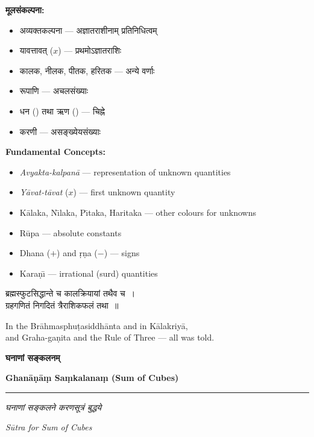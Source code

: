 \documentclass[11pt,a4paper]{article}
\newcommand{\dev}[1]{{\devanagarifont #1}}
\newcommand{\bicol}[2]{%
\noindent%
\begin{minipage}[t]{0.48\textwidth}
\begin{flushleft}
\small
#1
\end{flushleft}
\end{minipage}%
\hfill%
\begin{minipage}[t]{0.48\textwidth}
\begin{flushleft}
\small
#2
\end{flushleft}
\end{minipage}%
\vspace{0.4em}
}
\newcommand{\bicolverse}[2]{%
\par\noindent%
\begin{minipage}[t]{0.48\textwidth}
\centering
\color{versecolor}
\devanagarifont
\small
#1
\end{minipage}%
\hfill%
\begin{minipage}[t]{0.48\textwidth}
\centering
\color{versecolor}
\small
#2
\end{minipage}%
\par\vspace{0.4em}
}
\newcommand{\sectionbicol}[2]{%
\vspace{0.5em}
\noindent%
\begin{minipage}[t]{0.48\textwidth}
\begin{center}
\large\bfseries\color{sectioncolor}
\dev{#1}
\end{center}
\end{minipage}%
\hfill%
\begin{minipage}[t]{0.48\textwidth}
\begin{center}
\large\bfseries\color{sectioncolor}
#2
\end{center}
\end{minipage}%
\vspace{0.3em}
\noindent\rule{\textwidth}{0.4pt}
}
\newcommand{\subsectionbicol}[2]{%
\vspace{0.4em}
\noindent%
\begin{minipage}[t]{0.48\textwidth}
\begin{center}
\normalsize\itshape\color{sectioncolor}
\dev{#1}
\end{center}
\end{minipage}%
\hfill%
\begin{minipage}[t]{0.48\textwidth}
\begin{center}
\normalsize\itshape\color{sectioncolor}
#2
\end{center}
\end{minipage}%
\vspace{0.2em}
}
\begin{document}
\vspace{0.5cm}

\bicol{%
\textbf{मूलसंकल्पना:}
\begin{itemize}[leftmargin=1.5em,topsep=0pt]
\item अव्यक्तकल्पना --- अज्ञातराशीनाम् प्रतिनिधित्वम्
\item यावत्तावत् ($x$) --- प्रथमोऽज्ञातराशिः
\item कालक, नीलक, पीतक, हरितक --- अन्ये वर्णाः
\item रूपाणि --- अचलसंख्याः
\item धन (\textplus) तथा ऋण (\textminus) --- चिह्ने
\item करणी --- असङ्ख्येयसंख्याः
\end{itemize}
}{%
\textbf{Fundamental Concepts:}
\begin{itemize}[leftmargin=1.5em,topsep=0pt]
\item \textit{Avyakta-kalpan\={a}} --- representation of unknown quantities
\item \textit{Y\={a}vat-t\={a}vat} ($x$) --- first unknown quantity
\item K\={a}laka, N\={\i}laka, P\={\i}taka, Haritaka --- other colours for unknowns
\item R\={u}pa --- absolute constants
\item Dhana ($+$) and \d{r}\d{n}a ($-$) --- signs
\item Kara\d{n}\={\i} --- irrational (surd) quantities
\end{itemize}
}

\vspace{0.5cm}

\bicolverse{%
ब्रह्मस्फुटसिद्धान्ते च कालक्रियायां तथैव च~।\\
ग्रहगणितं निगदितं त्रैराशिकफलं तथा~॥
}{%
In the Br\={a}hmasphu\d{t}asiddh\={a}nta and in K\={a}lakriy\={a},\\
and Graha-ga\d{n}ita and the Rule of Three --- all was told.
}

\clearpage

\sectionbicol{घनाणां सङ्कलनम्}{Ghan\={a}\d{n}\={a}\d{m} Sa\d{m}kalana\d{m} (Sum of Cubes)}

\vspace{0.3cm}

\subsectionbicol{घनाणां सङ्कलने करणसूत्रं बुद्धये}{S\={u}tra for Sum of Cubes}
\end{document}
